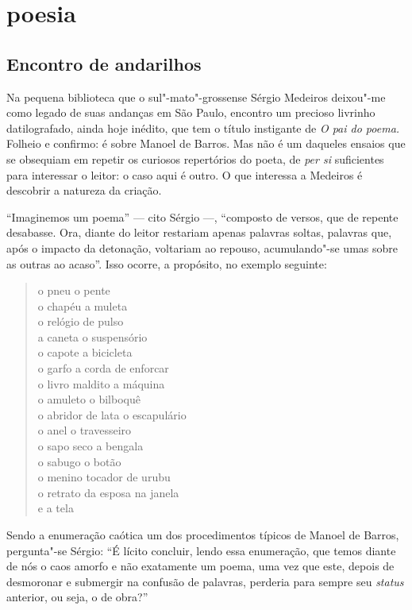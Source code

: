 \part{poesia}

\chapter{Encontro de andarilhos}

Na pequena biblioteca que o sul"-mato"-grossense Sérgio Medeiros deixou"-me
como legado de suas andanças em São Paulo, encontro um precioso livrinho
datilografado, ainda hoje inédito, que tem o título instigante de
\emph{O pai do poema.} Folheio e confirmo: é sobre Manoel de Barros. Mas
não é um daqueles ensaios que se obsequiam em repetir os curiosos
repertórios do poeta, de \emph{per si} suficientes para interessar o
leitor: o caso aqui é outro. O que interessa a Medeiros é descobrir a
natureza da criação.

``Imaginemos um poema'' --- cito Sérgio ---, ``composto de versos, que de
repente desabasse. Ora, diante do leitor restariam apenas palavras
soltas, palavras que, após o impacto da detonação, voltariam ao repouso,
acumulando"-se umas sobre as outras ao acaso''. Isso ocorre, a propósito,
no exemplo seguinte:

\begin{verse}
o pneu o pente \\
o chapéu a muleta \\
o relógio de pulso \\
a caneta o suspensório \\
o capote a bicicleta \\
o garfo a corda de enforcar \\
o livro maldito a máquina \\
o amuleto o bilboquê \\
o abridor de lata o escapulário \\
o anel o travesseiro \\
o sapo seco a bengala \\
o sabugo o botão \\
o menino tocador de urubu \\
o retrato da esposa na janela \\
e a tela
\end{verse}

Sendo a enumeração caótica um dos procedimentos típicos de Manoel de
Barros, pergunta"-se Sérgio: ``É lícito concluir, lendo essa enumeração,
que temos diante de nós o caos amorfo e não exatamente um poema, uma vez
que este, depois de desmoronar e submergir na confusão de palavras,
perderia para sempre seu \emph{status} anterior, ou seja, o de
obra?''

